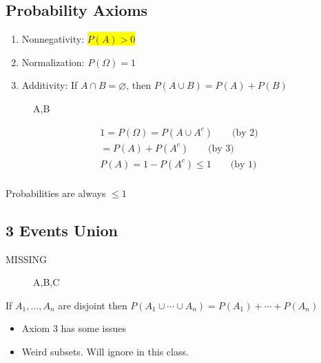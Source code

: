 \subsection{Probability Axioms}

\begin{enumerate}
    \item Nonnegativity: \colorbox{yellow}{$P(A) > 0$}
    \item Normalization: $P(\Omega)=1$
    \item Additivity: If $A \cap B = \varnothing$, then $P(A \cup B)=P(A) + P(B)$
\end{enumerate}

\begin{figure}[!ht]
\centering
{}
\caption{A,B} \label{fig:M2}
\end{figure}

\begin{align*}
1 = P(\Omega) = P(A \cup A^c) \qquad \text{(by 2)}\\
= P(A) + P(A^c)  \qquad \text{(by 3)}\\
P(A) = 1 - P(A^c) \le 1  \qquad \text{(by 1)}\\
\end{align*}

Probabilities are always $\le 1$

\subsection{3 Events Union}

MISSING

\begin{figure}[!ht]
\centering
{}
\caption{A,B,C} \label{fig:M3}
\end{figure}

If $A_1,\ldots, A_n$ are disjoint then $P(A_1 \cup \cdots \cup A_n) = P(A_1) + \cdots + P(A_n)$

\begin{itemize}
    \item Axiom 3 has some issues 
    \item Weird subsets.  Will ignore in this class.
\end{itemize}

